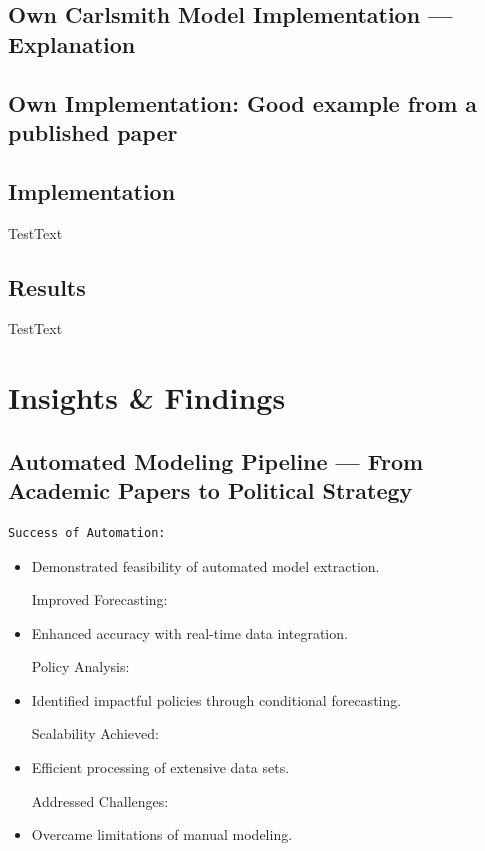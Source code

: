 \documentclass[
  letterpaper,
]{book}
\begin{document}
\section{Own Carlsmith Model Implementation ---
Explanation}\label{own-carlsmith-model-implementation-explanation}

\section{Own Implementation: Good example from a published
paper}\label{own-implementation-good-example-from-a-published-paper}

\section{Implementation}\label{implementation}

TestText

\section{Results}\label{results}

TestText


\chapter{Insights \& Findings}\label{insights-findings}

\section{Automated Modeling Pipeline --- From Academic Papers to
Political
Strategy}\label{automated-modeling-pipeline-from-academic-papers-to-political-strategy}

\begin{verbatim}
Success of Automation:
\end{verbatim}

\begin{itemize}
\item
  Demonstrated feasibility of automated model extraction.

  Improved Forecasting:
\item
  Enhanced accuracy with real-time data integration.

  Policy Analysis:
\item
  Identified impactful policies through conditional forecasting.

  Scalability Achieved:
\item
  Efficient processing of extensive data sets.

  Addressed Challenges:
\item
  Overcame limitations of manual modeling.
\end{itemize}
\end{document}
